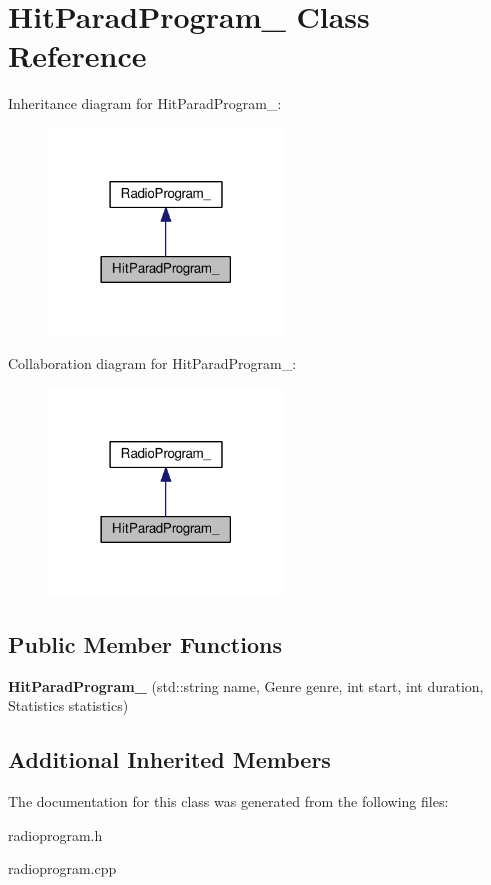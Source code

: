 \hypertarget{class_hit_parad_program__}{}\section{Hit\+Parad\+Program\+\_\+ Class Reference}
\label{class_hit_parad_program__}


Inheritance diagram for Hit\+Parad\+Program\+\_\+\+:
\nopagebreak
\begin{figure}[H]
\begin{center}
\leavevmode
\includegraphics[width=177pt]{class_hit_parad_program____inherit__graph}
\end{center}
\end{figure}


Collaboration diagram for Hit\+Parad\+Program\+\_\+\+:
\nopagebreak
\begin{figure}[H]
\begin{center}
\leavevmode
\includegraphics[width=177pt]{class_hit_parad_program____coll__graph}
\end{center}
\end{figure}
\subsection*{Public Member Functions}
\begin{DoxyCompactItemize}
\item 
{\bfseries Hit\+Parad\+Program\+\_\+} (std\+::string name, Genre genre, int start, int duration, Statistics statistics)\hypertarget{class_hit_parad_program___a1097191ce7b288b3dad730dc0b0e8446}{}\label{class_hit_parad_program___a1097191ce7b288b3dad730dc0b0e8446}

\end{DoxyCompactItemize}
\subsection*{Additional Inherited Members}


The documentation for this class was generated from the following files\+:\begin{DoxyCompactItemize}
\item 
radioprogram.\+h\item 
radioprogram.\+cpp\end{DoxyCompactItemize}
